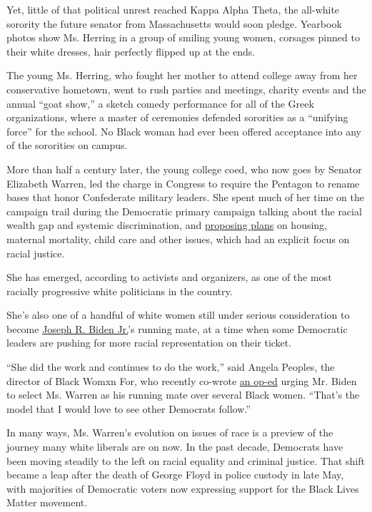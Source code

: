 Yet, little of that political unrest reached Kappa Alpha Theta, the
all-white sorority the future senator from Massachusetts would soon
pledge. Yearbook photos show Ms. Herring in a group of smiling young
women, corsages pinned to their white dresses, hair perfectly flipped up
at the ends.

The young Ms. Herring, who fought her mother to attend college away from
her conservative hometown, went to rush parties and meetings, charity
events and the annual ``goat show,'' a sketch comedy performance for all
of the Greek organizations, where a master of ceremonies defended
sororities as a ``unifying force'' for the school. No Black woman had
ever been offered acceptance into any of the sororities on campus.

More than half a century later, the young college coed, who now goes by
Senator Elizabeth Warren, led the charge in Congress to require the
Pentagon to rename bases that honor Confederate military leaders. She
spent much of her time on the campaign trail during the Democratic
primary campaign talking about the racial wealth gap and systemic
discrimination, and
\href{https://www.nytimes3xbfgragh.onion/2019/06/10/us/politics/elizabeth-warren-2020-policies-platform.html}{proposing
plans} on housing, maternal mortality, child care and other issues,
which had an explicit focus on racial justice.

She has emerged, according to activists and organizers, as one of the
most racially progressive white politicians in the country.

She's also one of a handful of white women still under serious
consideration to become
\href{https://www.nytimes3xbfgragh.onion/interactive/2020/us/elections/joe-biden.html}{Joseph
R. Biden Jr.}'s running mate, at a time when some Democratic leaders are
pushing for more racial representation on their ticket.

``She did the work and continues to do the work,'' said Angela Peoples,
the director of Black Womxn For, who recently co-wrote
\href{https://www.washingtonpost.com/outlook/2020/07/15/biden-black-women-warren-running-mate/}{an
op-ed} urging Mr. Biden to select Ms. Warren as his running mate over
several Black women. ``That's the model that I would love to see other
Democrats follow.''

In many ways, Ms. Warren's evolution on issues of race is a preview of
the journey many white liberals are on now. In the past decade,
Democrats have been moving steadily to the left on racial equality and
criminal justice. That shift became a leap after the death of George
Floyd in police custody in late May, with majorities of Democratic
voters now expressing support for the Black Lives Matter movement.

